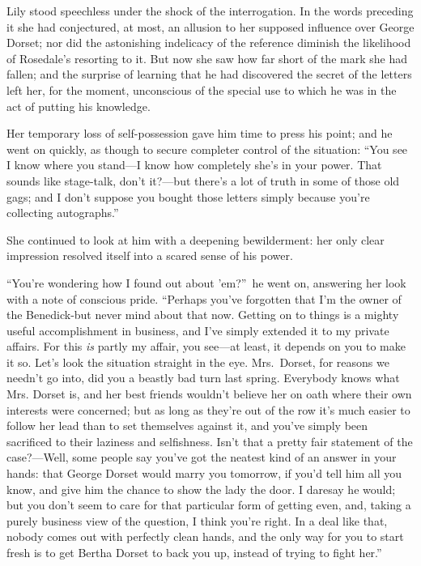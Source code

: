 \documentclass[12pt,a4paper]{book}
\begin{document}
Lily stood speechless under the shock of the interrogation. In
the words preceding it she had conjectured, at most, an allusion
to her supposed influence over George Dorset; nor did the
astonishing indelicacy of the reference diminish the likelihood
of Rosedale's resorting to it. But now she saw how far short of
the mark she had fallen; and the surprise of learning that he had
discovered the secret of the letters left her, for the moment,
unconscious of the special use to which he was in the act of
putting his knowledge.





Her temporary loss of self-possession gave him time to press his
point; and he went on quickly, as though to secure completer
control of the situation: ``You see I know where you stand---I know
how completely she's in your power. That sounds like stage-talk,
don't it?---but there's a lot of truth in some of those old gags;
and I don't suppose you bought those letters simply because
you're collecting autographs.''





She continued to look at him with a deepening bewilderment: her
only clear impression resolved itself into a scared sense of his
power.





``You're wondering how I found out about 'em?''\ he went on,
answering her look with a note of conscious pride. ``Perhaps
you've forgotten that I'm the owner of the Benedick-but never
mind about that now. Getting on to things is a mighty useful
accomplishment in business, and I've simply extended it to my
private affairs. For this \textit{is} partly my affair, you see---at least,
it depends on you to make it so. Let's look the situation
straight in the eye. Mrs.\ Dorset, for reasons we needn't go into,
did you a beastly bad turn last spring. Everybody knows what Mrs.
Dorset is, and her best friends wouldn't believe her on oath
where their own interests were concerned; but as long as they're
out of the row it's much easier to follow her lead than to set
themselves against it, and you've simply been sacrificed to their
laziness and selfishness. Isn't that a pretty fair statement of
the case?---Well, some people say you've got the neatest kind of
an answer in your hands: that George Dorset would marry you
tomorrow, if you'd tell him all you know, and give him the chance
to show the lady the door. I daresay he would; but you don't seem
to care for that particular form of getting even, and,
taking a purely business view of the question, I think you're
right. In a deal like that, nobody comes out with perfectly clean
hands, and the only way for you to start fresh is to get Bertha
Dorset to back you up, instead of trying to fight her.''
\end{document}
